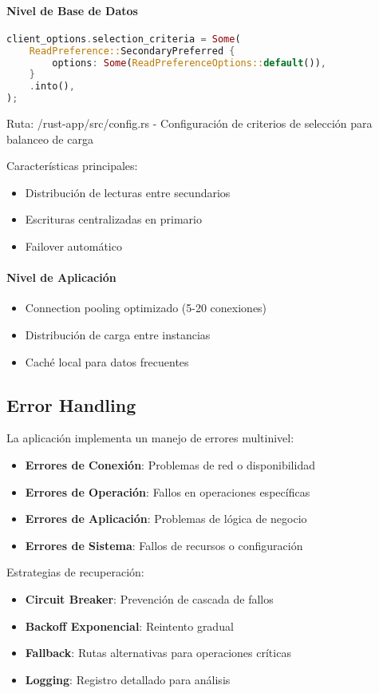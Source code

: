 \documentclass[12pt,letterpaper]{article}
\begin{document}
\paragraph{Nivel de Base de Datos}
\begin{lstlisting}[language=rust]
client_options.selection_criteria = Some(
    ReadPreference::SecondaryPreferred {
        options: Some(ReadPreferenceOptions::default()),
    }
    .into(),
);
\end{lstlisting}
\small{Ruta: /rust-app/src/config.rs - Configuración de criterios de selección para balanceo de carga}

Características principales:
\begin{itemize}
    \item Distribución de lecturas entre secundarios
    \item Escrituras centralizadas en primario
    \item Failover automático
\end{itemize}

\paragraph{Nivel de Aplicación}
\begin{itemize}
    \item Connection pooling optimizado (5-20 conexiones)
    \item Distribución de carga entre instancias
    \item Caché local para datos frecuentes
\end{itemize}

\subsection{Error Handling}
La aplicación implementa un manejo de errores multinivel:

\begin{itemize}
    \item \textbf{Errores de Conexión}: Problemas de red o disponibilidad
    \item \textbf{Errores de Operación}: Fallos en operaciones específicas
    \item \textbf{Errores de Aplicación}: Problemas de lógica de negocio
    \item \textbf{Errores de Sistema}: Fallos de recursos o configuración
\end{itemize}

Estrategias de recuperación:
\begin{itemize}
    \item \textbf{Circuit Breaker}: Prevención de cascada de fallos
    \item \textbf{Backoff Exponencial}: Reintento gradual
    \item \textbf{Fallback}: Rutas alternativas para operaciones críticas
    \item \textbf{Logging}: Registro detallado para análisis
\end{itemize}
\end{document}
